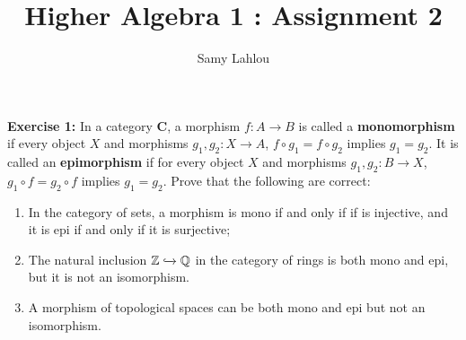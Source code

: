 \documentclass{article}
\title{Higher Algebra 1 : Assignment 2}
\author{Samy Lahlou}
\date{}
\newcommand{\Q}{\mathbb{Q}}
\newcommand{\Z}{\mathbb{Z}}
\newcommand{\CatC}{\textbf{C}}
\begin{document}
\maketitle

\noindent \textbf{Exercise 1:} In a category \CatC, a morphism $f : A \to B$ is called a \textbf{monomorphism} if every object $X$ and morphisms $g_1, g_2 : X \to A$, $f \circ g_1 = f \circ g_2$ implies $g_1 = g_2$. It is called an \textbf{epimorphism} if for every object $X$ and morphisms $g_1, g_2 : B \to X$, $g_1 \circ f = g_2 \circ f$ implies $g_1 = g_2$. Prove that the following are correct:
\begin{enumerate}[label=(\alph*)]
    \item In the category of sets, a morphism is mono if and only if if is injective, and it is epi if and only if it is surjective;
    \item The natural inclusion $\Z \xhookrightarrow{} \Q$ in the category of rings is both mono and epi, but it is not an isomorphism.
    \item A morphism of topological spaces can be both mono and epi but not an isomorphism.
\end{enumerate}
\end{document}
